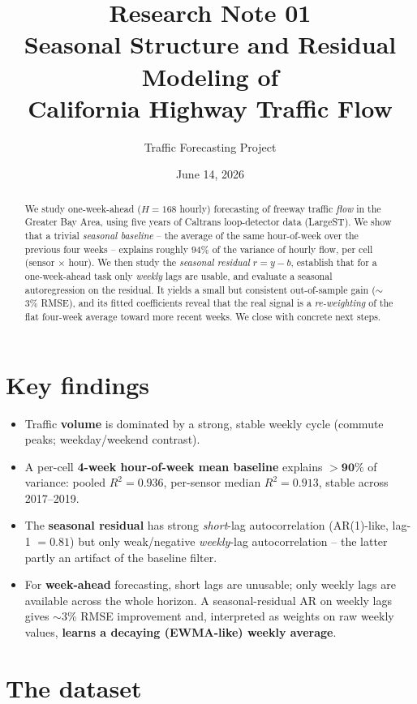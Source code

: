\documentclass[11pt]{article}
\title{\textbf{Research Note 01}\\[2pt]
Seasonal Structure and Residual Modeling of\\ California Highway Traffic Flow}
\author{Traffic Forecasting Project}
\date{June 14, 2026}
\begin{document}
\maketitle

\begin{abstract}
\noindent
We study one-week-ahead ($H{=}168$ hourly) forecasting of freeway traffic
\emph{flow} in the Greater Bay Area, using five years of Caltrans loop-detector
data (LargeST). We show that a trivial \emph{seasonal baseline} -- the average
of the same hour-of-week over the previous four weeks -- explains roughly
$94\%$ of the variance of hourly flow, per cell (sensor $\times$ hour). We then
study the \emph{seasonal residual} $r=y-b$, establish that for a one-week-ahead
task only \emph{weekly} lags are usable, and evaluate a seasonal autoregression
on the residual. It yields a small but consistent out-of-sample gain
($\sim$3\% RMSE), and its fitted coefficients reveal that the real signal is a
\emph{re-weighting} of the flat four-week average toward more recent weeks. We
close with concrete next steps.
\end{abstract}

\section*{Key findings}
\begin{itemize}
\item Traffic \textbf{volume} is dominated by a strong, stable weekly cycle
  (commute peaks; weekday/weekend contrast).
\item A per-cell \textbf{4-week hour-of-week mean baseline} explains
  $\mathbf{>90\%}$ of variance: pooled $R^2 = 0.936$, per-sensor median
  $R^2=0.913$, stable across 2017--2019.
\item The \textbf{seasonal residual} has strong \emph{short}-lag autocorrelation
  (AR(1)-like, lag-1 $=0.81$) but only weak/negative \emph{weekly}-lag
  autocorrelation -- the latter partly an artifact of the baseline filter.
\item For \textbf{week-ahead} forecasting, short lags are unusable; only weekly
  lags are available across the whole horizon. A seasonal-residual AR on weekly
  lags gives $\sim$3\% RMSE improvement and, interpreted as weights on raw weekly
  values, \textbf{learns a decaying (EWMA-like) weekly average}.
\end{itemize}

\section{The dataset}
\label{sec:data}
\end{document}
